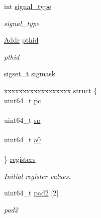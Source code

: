 \begin{DoxyCompactItemize}
int \hyperlink{structTru64_1_1nxm__thread__attr_a83a847385a7ebdc5a054dd0e1ab6f0e9}{signal\_\-type}
\begin{DoxyCompactList}\small\item\em signal\_\-type \item\end{DoxyCompactList}\item 
\hyperlink{base_2types_8hh_af1bb03d6a4ee096394a6749f0a169232}{Addr} \hyperlink{structTru64_1_1nxm__thread__attr_af7f4b7550d078bd48a2c270556b49d68}{pthid}
\begin{DoxyCompactList}\small\item\em pthid \item\end{DoxyCompactList}\item 
\hyperlink{classTru64_ae770e87ab143e8ad7feaf75b78a89718}{sigset\_\-t} \hyperlink{structTru64_1_1nxm__thread__attr_a84a273d642c19957017a87b1f54031e6}{sigmask}
\item 
\begin{tabbing}
xx\=xx\=xx\=xx\=xx\=xx\=xx\=xx\=xx\=\kill
struct \{\\
\>uint64\_t \hyperlink{structTru64_1_1nxm__thread__attr_a37cc15f96d8bac81ed087fc247a0c5a0}{pc}\\
\>\\
\>uint64\_t \hyperlink{structTru64_1_1nxm__thread__attr_acd6941efd501803089091f06f1967f7d}{sp}\\
\>\\
\>uint64\_t \hyperlink{structTru64_1_1nxm__thread__attr_adafeae317d72d102ea18f6cdbbdee4db}{a0}\\
\>\\
\} \hyperlink{structTru64_1_1nxm__thread__attr_a6c91caa556776951bbcfb885487bb2e3}{registers}\\

\end{tabbing}\begin{DoxyCompactList}\small\item\em Initial register values. \item\end{DoxyCompactList}\item 
uint64\_\-t \hyperlink{structTru64_1_1nxm__thread__attr_ab4facb1f9e21ad7ed046f59b180ac05b}{pad2} \mbox{[}2\mbox{]}
\begin{DoxyCompactList}\small\item\em pad2 \item\end{DoxyCompactList}\end{DoxyCompactItemize}


